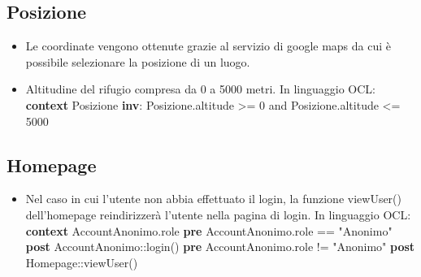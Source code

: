 \documentclass[a4paper,12pt]{article}
\begin{document}
\subsection{Posizione}
\begin{itemize}
    \item Le coordinate vengono ottenute grazie al servizio di google maps da cui è possibile selezionare la posizione di un luogo.
    \item Altitudine del rifugio compresa da 0 a 5000 metri. \newline \newline In linguaggio OCL:\newline
    \textbf{context} Posizione \textbf{inv}: Posizione.altitude >= 0 and Posizione.altitude <= 5000
\end{itemize}

\subsection{Homepage}
\begin{itemize}
    \item Nel caso in cui l'utente non abbia effettuato il login, la funzione viewUser() dell'homepage reindirizzerà l'utente nella pagina di login. \newline \newline In linguaggio OCL:\newline
    \textbf{context} AccountAnonimo.role \newline
    \textbf{pre} AccountAnonimo.role == "Anonimo"\newline
    \textbf{post} AccountAnonimo::login()\newline
    \textbf{pre} AccountAnonimo.role != "Anonimo" \newline
    \textbf{post} Homepage::viewUser()
\end{itemize}
\end{document}
